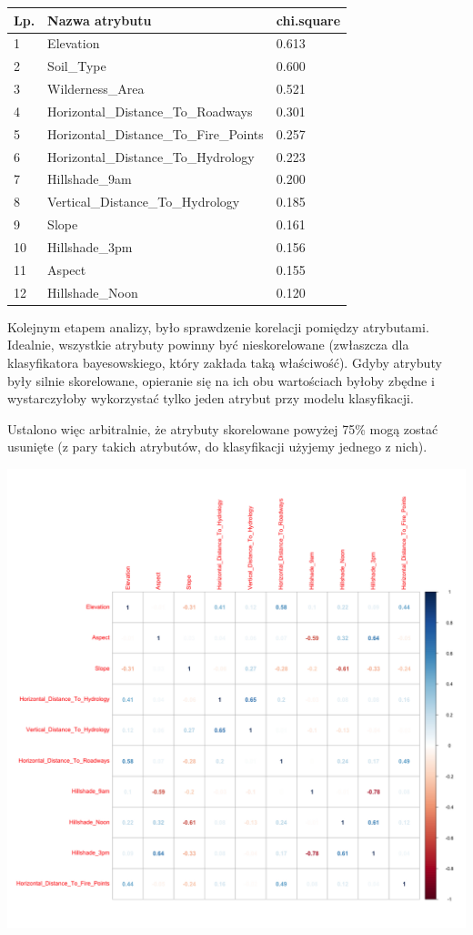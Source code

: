 \documentclass[11pt]{article} %
\begin{document}
\begin{center}
    \begin{tabular}{ | l | l | l | }
    \hline
    	Lp. & Nazwa atrybutu & chi.square \\ \hline
    	1 &Elevation & 0.613 \\
	2 & Soil\_Type & 0.600 \\
	3 & Wilderness\_Area &  0.521 \\
	4 & Horizontal\_Distance\_To\_Roadways & 0.301 \\
	5 & Horizontal\_Distance\_To\_Fire\_Points & 0.257 \\
	6 & Horizontal\_Distance\_To\_Hydrology & 0.223 \\
	7 & Hillshade\_9am &  0.200 \\ 
	8 & Vertical\_Distance\_To\_Hydrology & 0.185 \\
	9 & Slope &  0.161 \\
	10 & Hillshade\_3pm & 0.156 \\
	11 & Aspect & 0.155 \\ 
	12 & Hillshade\_Noon & 0.120 \\ \hline
    \end{tabular}
\end{center}

Kolejnym etapem analizy, było sprawdzenie korelacji pomiędzy atrybutami. Idealnie, wszystkie atrybuty powinny być nieskorelowane (zwłaszcza dla klasyfikatora bayesowskiego, który zakłada taką właściwość). Gdyby atrybuty były silnie skorelowane, opieranie się na ich obu wartościach byłoby zbędne i wystarczyłoby wykorzystać tylko jeden atrybut przy modelu klasyfikacji. 

Ustalono więc arbitralnie, że atrybuty skorelowane powyżej 75\% mogą zostać usunięte (z pary takich atrybutów, do klasyfikacji użyjemy jednego z nich).

\begin{center}
	\includegraphics[width=16cm]{correlation-matrix}
\end{center}
\end{document}

